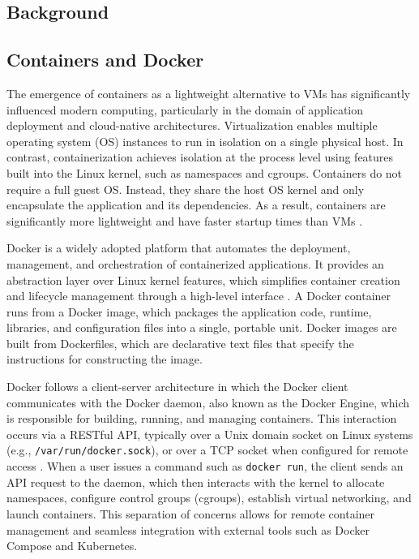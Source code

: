 \fontsize{12pt}{14pt} \selectfont
\begin{doublespace}
\chapter{Background}


\section{Containers and Docker}

The emergence of containers as a lightweight alternative to VMs has significantly influenced modern computing, particularly in the domain of application deployment and cloud-native architectures. Virtualization enables multiple operating system (OS) instances to run in isolation on a single physical host. In contrast, containerization achieves isolation at the process level using features built into the Linux kernel, such as namespaces and cgroups. Containers do not require a full guest OS. Instead, they share the host OS kernel and only encapsulate the application and its dependencies. As a result, containers are significantly more lightweight and have faster startup times than VMs \cite{sharma2016containers}.

Docker is a widely adopted platform that automates the deployment, management, and orchestration of containerized applications. It provides an abstraction layer over Linux kernel features, which simplifies container creation and lifecycle management through a high-level interface \cite{ostrowski2024containerd}. A Docker container runs from a Docker image, which packages the application code, runtime, libraries, and configuration files into a single, portable unit. Docker images are built from \glspl{Dockerfile}, which are declarative text files that specify the instructions for constructing the image.

Docker follows a client-server architecture in which the Docker client communicates with the Docker daemon, also known as the \gls{Docker Engine}, which is responsible for building, running, and managing containers. This interaction occurs via a RESTful API, typically over a Unix domain socket on Linux systems (e.g., \texttt{/var/run/docker.sock}), or over a TCP socket when configured for remote access \cite{mrdevsecops_dockerarchitecture}. When a user issues a command such as \texttt{docker run}, the client sends an API request to the daemon, which then interacts with the kernel to allocate namespaces, configure control groups (cgroups), establish virtual networking, and launch containers. This separation of concerns allows for remote container management and seamless integration with external tools such as Docker Compose and Kubernetes.


\end{doublespace}
